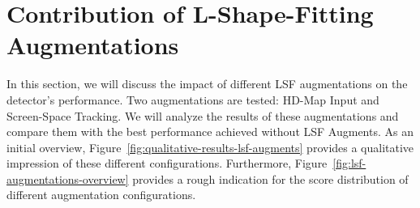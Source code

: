
\section{Contribution of L-Shape-Fitting Augmentations}
\label{sec:lsf-aug-impact}

In this section, we will discuss the impact of different LSF augmentations on the detector's performance.
Two augmentations are tested: HD-Map Input and Screen-Space Tracking.
We will analyze the results of these augmentations and compare them with the best performance achieved without LSF Augments.
As an initial overview, Figure~\ref{fig:qualitative-results-lsf-augments} provides a qualitative impression of these different configurations.
Furthermore, Figure~\ref{fig:lsf-augmentations-overview} provides a rough indication for the score distribution of different augmentation configurations.

